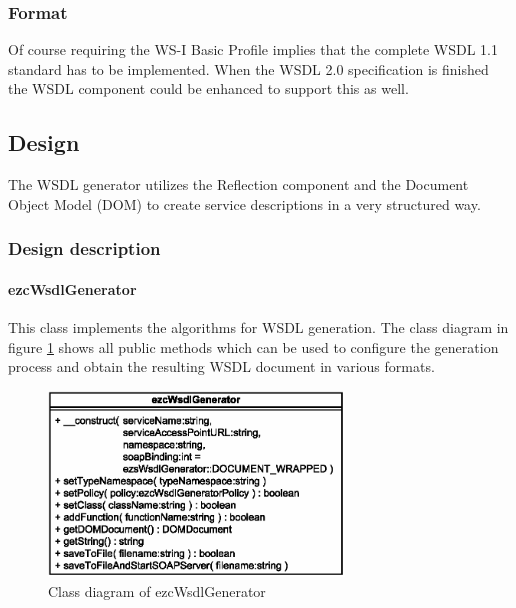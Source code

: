 \documentclass[10pt,final,a4paper,oneside]{article}
\begin{document}
\subsubsection{Format}
Of course requiring the WS-I Basic Profile implies
that the complete WSDL 1.1 standard has to be implemented.
When the WSDL 2.0 specification \cite{WSDL20} is finished
the WSDL component could be enhanced to support this as well.


\subsection{Design}\label{subsec:WSDLDesign}
%
%
The WSDL generator utilizes the Reflection component
and the Document Object Model (DOM)
to create service descriptions in a very structured way.



\subsubsection{Design description}

\paragraph{ezcWsdlGenerator}
This class implements the algorithms for WSDL generation.
The class diagram in figure \ref{fig:ezcWsdlGenerator.class-diagram}
shows all public methods which can be used 
to configure the generation process and
obtain the resulting WSDL document in various formats.

\begin{figure}[htbp]
	\centering
		\includegraphics[width=0.70\textwidth]{figures/ezcWsdlGenerator.class-diagram.eps}
	\caption{Class diagram of ezcWsdlGenerator}
	\label{fig:ezcWsdlGenerator.class-diagram}
\end{figure}
\end{document}
